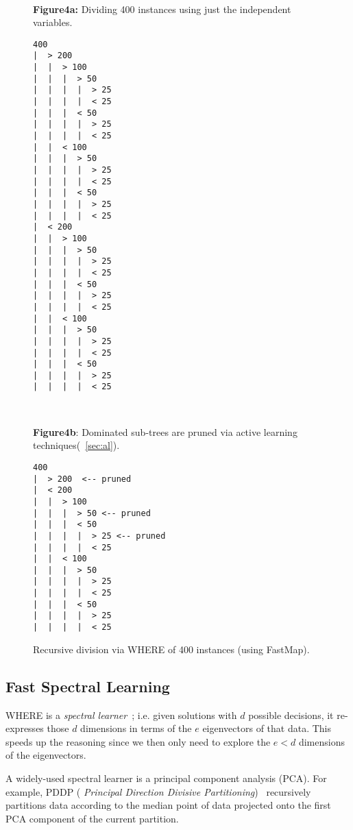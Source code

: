 \documentclass[10pt,journal,compsoc]{IEEEtran}
\newcommand{\tion}[1]{\textsection\ref{sec:#1}}
\begin{document}
\begin{figure}[!t]
{\fontsize{2mm}{0em}\selectfont 
~~~~~~~~\begin{minipage}[t]{1.5in}
{\small 
{\bf Figure4a:} 
Dividing 400 instances using just the independent variables.}

\begin{verbatim}
400
|  > 200
|  |  > 100
|  |  |  > 50
|  |  |  |  > 25
|  |  |  |  < 25
|  |  |  < 50
|  |  |  |  > 25
|  |  |  |  < 25
|  |  < 100
|  |  |  > 50
|  |  |  |  > 25
|  |  |  |  < 25
|  |  |  < 50
|  |  |  |  > 25
|  |  |  |  < 25
|  < 200
|  |  > 100
|  |  |  > 50
|  |  |  |  > 25
|  |  |  |  < 25
|  |  |  < 50
|  |  |  |  > 25
|  |  |  |  < 25
|  |  < 100
|  |  |  > 50
|  |  |  |  > 25
|  |  |  |  < 25
|  |  |  < 50
|  |  |  |  > 25
|  |  |  |  < 25
\end{verbatim}
\end{minipage}~~~~~~~~~\begin{minipage}[t]{1.5in}
{\small
{\bf Figure4b}: Dominated sub-trees are pruned via active learning techniques(~\tion{al}).}

\begin{verbatim}
400           
|  > 200  <-- pruned
|  < 200 
|  |  > 100 
|  |  |  > 50 <-- pruned
|  |  |  < 50 
|  |  |  |  > 25 <-- pruned
|  |  |  |  < 25 
|  |  < 100 
|  |  |  > 50 
|  |  |  |  > 25 
|  |  |  |  < 25 
|  |  |  < 50 
|  |  |  |  > 25 
|  |  |  |  < 25 
\end{verbatim}
\end{minipage}}
\caption{Recursive division via WHERE of 400 instances 
(using FastMap).}\label{fig:cluster1}
\end{figure}
 


\subsection{Fast Spectral Learning}
WHERE is a {\em spectral learner}~\cite{KamvarKM03}; i.e. given solutions with $d$ possible decisions,
it
re-expresses those $d$ dimensions in terms of the
$e$ eigenvectors of that data.
This speeds up the reasoning since we then only need to
explore the $e<d$ dimensions of the eigenvectors.

A widely-used spectral learner is a principal
 component analysis (PCA).  For example, PDDP ({\em
 Principal Direction Divisive
 Partitioning})~\cite{boley98} recursively
 partitions data according to the median point of
 data projected onto the first PCA component of the
 current partition.
\end{document}

